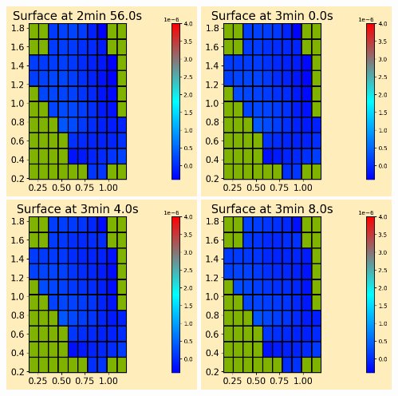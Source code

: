 \documentclass[11pt]{article}
\begin{document}
\vskip 10pt 
\includegraphics[width=0.475\textwidth]{frame0044fig0.png}
\vskip 10pt 
\includegraphics[width=0.475\textwidth]{frame0045fig0.png}
\vskip 10pt 
\includegraphics[width=0.475\textwidth]{frame0046fig0.png}
\vskip 10pt 
\includegraphics[width=0.475\textwidth]{frame0047fig0.png}
\end{document}
